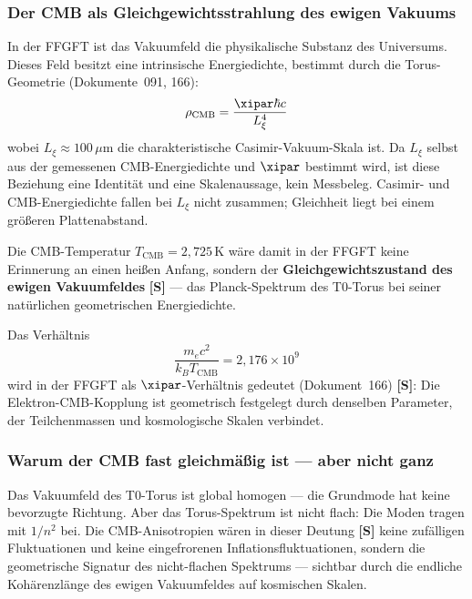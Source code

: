 \subsubsection*{Der CMB als Gleichgewichtsstrahlung des ewigen Vakuums}

In der FFGFT ist das Vakuumfeld die physikalische Substanz des Universums.
Dieses Feld besitzt eine intrinsische Energiedichte, bestimmt durch die
Torus-Geometrie (Dokumente~091, 166):
\begin{equation}
    \rho_\text{CMB} = \frac{\xipar \hbar c}{L_\xi^4}
\end{equation}
wobei $L_\xi \approx 100\,\mu\text{m}$ die charakteristische Casimir-Vakuum-Skala
ist. Da $L_\xi$ selbst aus der gemessenen CMB-Energiedichte und $\xipar$ bestimmt
wird, ist diese Beziehung eine Identität und eine Skalenaussage, kein Messbeleg.
Casimir- und CMB-Energiedichte fallen bei $L_\xi$ nicht zusammen; Gleichheit
liegt bei einem größeren Plattenabstand.

Die CMB-Temperatur $T_\text{CMB} = 2{,}725\,\text{K}$ wäre damit in der FFGFT keine
Erinnerung an einen heißen Anfang, sondern der \textbf{Gleichgewichtszustand
des ewigen Vakuumfeldes} \textbf{[S]} — das Planck-Spektrum des T0-Torus bei seiner
natürlichen geometrischen Energiedichte.

\begin{foundation}
Das Verhältnis
\begin{equation}
    \frac{m_e c^2}{k_B T_\text{CMB}} = 2{,}176 \times 10^9
\end{equation}
wird in der FFGFT als $\xipar$-Verhältnis gedeutet (Dokument~166) \textbf{[S]}:
Die Elektron-CMB-Kopplung ist geometrisch festgelegt durch denselben
Parameter, der Teilchenmassen und kosmologische Skalen verbindet.
\end{foundation}

\subsubsection*{Warum der CMB fast gleichmäßig ist — aber nicht ganz}

Das Vakuumfeld des T0-Torus ist global homogen — die Grundmode hat keine
bevorzugte Richtung. Aber das Torus-Spektrum ist nicht flach: Die Moden
tragen mit $1/n^2$ bei. Die CMB-Anisotropien wären in dieser Deutung \textbf{[S]} keine zufälligen
Fluktuationen und keine eingefrorenen Inflationsfluktuationen, sondern die
geometrische Signatur des nicht-flachen Spektrums — sichtbar durch die
endliche Kohärenzlänge des ewigen Vakuumfeldes auf kosmischen Skalen.

